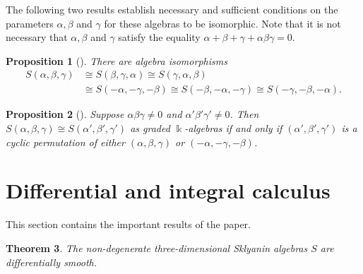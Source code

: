\documentclass{amsart}
\newtheorem{theorem}{Theorem}[section]
\newtheorem{proposition}[theorem]{Proposition}
\theoremstyle{definition}
\theoremstyle{remark}
\numberwithin{equation}{section}
\begin{document}
The following two results establish necessary and sufficient conditions on the parameters $\alpha,\beta$ and $\gamma$ for these algebras to be isomorphic. Note that it is not necessary that $\alpha,\beta$ and $\gamma$ satisfy the equality $\alpha+\beta+\gamma+\alpha\beta\gamma=0$.

\begin{proposition}[{\cite[Lemma 2.3]{ChirvasituSmith2023}}] \label{Isomorfimos-4Dim}
There are algebra isomorphisms 
\begin{align*}
    S(\alpha, \beta, \gamma) &\cong S(\beta, \gamma, \alpha)\cong S(\gamma, \alpha, \beta)\\
    &\cong S(-\alpha,- \gamma,-\beta)\cong S(-\beta,-\alpha, -\gamma)\cong S(-\gamma,-\beta,-\alpha).
\end{align*}
\end{proposition}

\begin{proposition}[{\cite[Proposition 2.4]{ChirvasituSmith2023}}] Suppose $\alpha\beta\gamma\neq 0$ and $\alpha'\beta'\gamma'\neq 0$. Then $S(\alpha,\beta,\gamma)\cong S(\alpha',\beta',\gamma')$ as graded $\Bbbk$-algebras if and only if $(\alpha',\beta',\gamma')$ is a cyclic permutation of either $(\alpha,\beta,\gamma)$ or $(-\alpha,-\gamma,-\beta)$.
\end{proposition}

\section{Differential and integral calculus}\label{DifferentialandintegralcalculusSkly}

This section contains the important results of the paper.
\begin{theorem}\label{DS3Skly} 
The non-degenerate three-dimensional Sklyanin algebras $S$ are differentially smooth.
\end{theorem}
\end{document}

